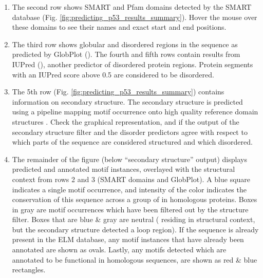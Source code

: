 \begin{enumerate}
\item The second row shows SMART and Pfam domains detected by the SMART
	database \cite{9600884, 25300481, 9600884}
	(Fig. \ref{fig:predicting_p53_results_summary}). Hover the
	mouse over these domains to see their names and exact start and end
	positions.


\item The third row shows globular and disordered regions in the
	sequence as predicted by GlobPlot (\cite{12824398}). The fourth
	and fifth rows
	contain results from IUPred (\cite{15955779}), another
	predictor of disordered protein regions. Protein segments with
	an IUPred score above 0.5 are considered to be disordered.


\item The 5th row (Fig. \ref{fig:predicting_p53_results_summary}) contains
	information on secondary structure. The secondary structure is
	predicted using a pipeline mapping motif occurrence onto high quality
	reference domain structures \cite{19852836}. Check the graphical
	representation, and if the output of the secondary structure filter and
	the disorder predictors agree with respect to which parts of the
	sequence are considered structured and which disordered.

\item The remainder of the figure (below ``secondary structure'' output)
	displays predicted and annotated motif instances, overlayed with the
	structural context from rows 2 and 3 (SMART domains and GlobPlot). A
	blue square indicates a single motif occurrence, and intensity of the
	color indicates the conservation of this sequence across a group of in
	homologous proteins.
	Boxes in gray are motif occurrences which have been filtered out by the
	structure filter. Boxes that are blue \& gray are neutral (
	residing in structural context, but the secondary structure detected a
	loop region). If the sequence is already present in the ELM database,
	any motif instances that have already been annotated are shown as
	ovals. Lastly, any motifs detected which are annotated to be
	functional in homologous sequences, are shown as red \& blue
	rectangles.


\end{enumerate}
